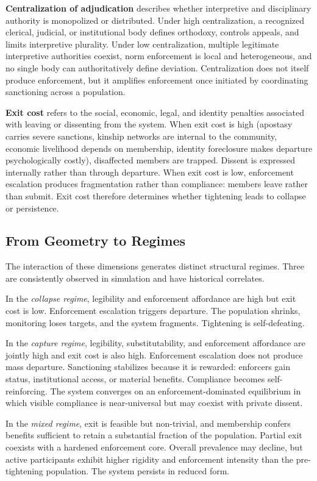 \documentclass[12pt]{article}
\begin{document}
\textbf{Centralization of adjudication} describes whether interpretive and disciplinary authority is monopolized or distributed. Under high centralization, a recognized clerical, judicial, or institutional body defines orthodoxy, controls appeals, and limits interpretive plurality. Under low centralization, multiple legitimate interpretive authorities coexist, norm enforcement is local and heterogeneous, and no single body can authoritatively define deviation. Centralization does not itself produce enforcement, but it amplifies enforcement once initiated by coordinating sanctioning across a population.

\textbf{Exit cost} refers to the social, economic, legal, and identity penalties associated with leaving or dissenting from the system. When exit cost is high (apostasy carries severe sanctions, kinship networks are internal to the community, economic livelihood depends on membership, identity foreclosure makes departure psychologically costly), disaffected members are trapped. Dissent is expressed internally rather than through departure. When exit cost is low, enforcement escalation produces fragmentation rather than compliance: members leave rather than submit. Exit cost therefore determines whether tightening leads to collapse or persistence.

%
\subsection{From Geometry to Regimes}

The interaction of these dimensions generates distinct structural regimes. Three are consistently observed in simulation and have historical correlates.

In the \emph{collapse regime}, legibility and enforcement affordance are high but exit cost is low. Enforcement escalation triggers departure. The population shrinks, monitoring loses targets, and the system fragments. Tightening is self-defeating.

In the \emph{capture regime}, legibility, substitutability, and enforcement affordance are jointly high and exit cost is also high. Enforcement escalation does not produce mass departure. Sanctioning stabilizes because it is rewarded: enforcers gain status, institutional access, or material benefits. Compliance becomes self-reinforcing. The system converges on an enforcement-dominated equilibrium in which visible compliance is near-universal but may coexist with private dissent.

In the \emph{mixed regime}, exit is feasible but non-trivial, and membership confers benefits sufficient to retain a substantial fraction of the population. Partial exit coexists with a hardened enforcement core. Overall prevalence may decline, but active participants exhibit higher rigidity and enforcement intensity than the pre-tightening population. The system persists in reduced form.
\end{document}
